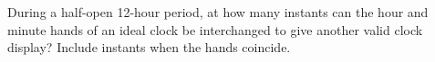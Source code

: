 During a half-open 12-hour period, at how many instants can the hour and minute hands of an ideal clock be interchanged to give another valid clock display? Include instants when the hands coincide.
